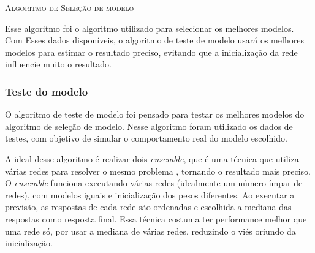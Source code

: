  \begin{algorithm}[H]
   \SetAlgoLined
    
  
   \Retorna{$\Theta$}
   \label{alg:selecao_modelo}
   \caption{\textsc{Algoritmo de Seleção de modelo }}
 \end{algorithm}
 
Esse algoritmo foi o algoritmo utilizado para selecionar os melhores modelos. Com Esses dados disponíveis, o algoritmo de teste de modelo usará os melhores modelos para estimar o resultado preciso, evitando que a inicialização da rede influencie muito o resultado.

\subsubsection{Teste do modelo}

O algoritmo de teste de modelo foi pensado para testar os melhores modelos do algoritmo de seleção de modelo. Nesse algoritmo foram utilizado os dados de testes, com objetivo de simular o comportamento real do modelo escolhido.

A ideal desse algoritmo é realizar dois \textit{ensemble}, que é uma técnica que utiliza várias redes para resolver o mesmo problema , tornando o resultado mais preciso. O \textit{ensemble} funciona executando várias redes (idealmente um número ímpar de redes), com modelos iguais e inicialização dos pesos diferentes.  Ao executar a previsão, as respostas de cada rede são ordenadas e escolhida a mediana das respostas como resposta final. Essa técnica costuma ter performance melhor que uma rede só, por usar a mediana de várias redes, reduzindo o viés oriundo da inicialização.

